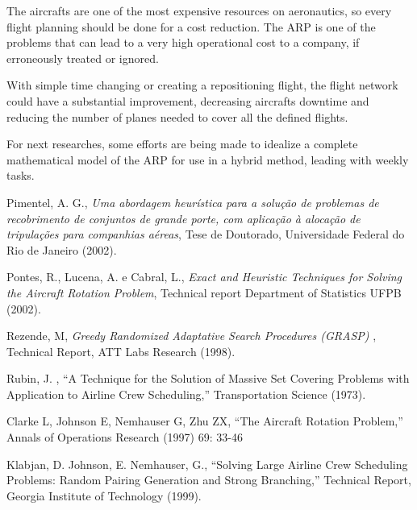 \documentclass{endm}
\begin{document}
The aircrafts are one of the most expensive resources on aeronautics, so every flight planning should be done for a cost reduction. The ARP is one of the problems that can lead to a very high operational cost to a company, if erroneously treated or ignored.

With simple time changing or creating a repositioning flight, the flight network could have a substantial improvement, decreasing aircrafts downtime and reducing the number of planes needed to cover all the defined flights.

For next researches, some efforts are being made to idealize a complete mathematical model of the ARP for use in a hybrid method, leading with weekly tasks.

\begin{thebibliography}{10}\label{bibliography}

 Pimentel, A. G., \emph{Uma abordagem heur\'istica para a solu\c{c}\~ao de problemas de recobrimento de conjuntos de grande porte, com aplica\c{c}\~ao \`a aloca\c{c}\~ao de tripula\c{c}\~oes para companhias a\'ereas}, Tese de Doutorado, Universidade Federal do Rio de Janeiro (2002).

 Pontes, R., Lucena, A. e Cabral, L., \emph{Exact and Heuristic Techniques for Solving the Aircraft
Rotation Problem}, Technical report Department of Statistics UFPB (2002).

 Rezende, M, \emph{Greedy Randomized Adaptative Search Procedures (GRASP) }, Technical 
Report, ATT Labs Research (1998).
  
  Rubin, J. , ``A Technique for the Solution of Massive Set Covering Problems with Application 
to Airline Crew Scheduling,'' Transportation Science (1973).
  
  Clarke L, Johnson E, Nemhauser G, Zhu ZX, ``The Aircraft Rotation Problem,'' Annals of 
Operations Research (1997) 69: 33-46
  
 Klabjan, D. Johnson, E. Nemhauser, G., ``Solving Large Airline Crew Scheduling 
Problems: Random Pairing Generation and Strong Branching,'' Technical Report, Georgia Institute of 
Technology (1999).  

\end{thebibliography}

\newpage

\appendix
\end{document}
